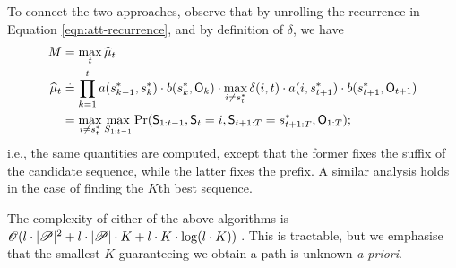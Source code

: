 To connect the two approaches, observe that by unrolling the recurrence in Equation \ref{eqn:att-recurrence}, and by definition of $\delta$, we have
\begin{align*}
	M &= \max_t \widehat{\mu}_t \\
	\widehat{\mu}_{t} &\stackrel{.}{=} \prod_{k = 1}^t a( s^*_{k-1}, s^*_{k} ) \cdot b( s^*_{k}, \mathsf{O}_{k} ) \cdot \max_{i \neq s^*_{t}} \delta(i, t) \cdot a( i, s^*_{t+1} ) \cdot b( s^*_{t+1}, \mathsf{O}_{t+1} ) \\
	&= \max_{i \neq s^*_{t}} \max_{S_{1:t-1}} {\Pr( \mathsf{S}_{1:t-1}, \mathsf{S}_t = i, \mathsf{S}_{t+1:T} = s^*_{t+1:T}, \mathsf{O}_{1:T} )};
\end{align*}
i.e., the same quantities are computed, except that the former fixes the suffix of the candidate sequence, while the latter fixes the prefix.
A similar analysis holds in the case of finding the $K$th best sequence.

The complexity of either of the above algorithms is $\mathscr{O}( l \cdot |\mathscr{P}|^2 + l \cdot |\mathscr{P}| \cdot K + l \cdot K \cdot \log( l \cdot K ) )$ \citep{nilsson2001sequentially}.
This is tractable, but we emphasise that the smallest $K$ guaranteeing we obtain a path is unknown \emph{a-priori}.
